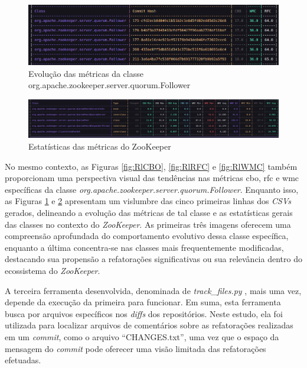 \begin{figure}[h]
    \centering
    \includegraphics[width=0.8\linewidth]{figuras/Output/Metrics_Evolution/Metrics_Evolution.png}
    \caption{Evolução das métricas da classe org.apache.zookeeper.server.quorum.Follower}
    \label{fig:EvolutionFollowerClass}
\end{figure}

\begin{figure}[h]
    \centering
    \includegraphics[width=0.8\linewidth]{figuras/Output/Metrics_Statistics/Metrics_Statistics.png}
    \caption{Estatísticas das métricas do ZooKeeper}
    \label{fig:StatisticsFollowerClass}
\end{figure}

No mesmo contexto, as Figuras \ref{fig:RlCBO}, \ref{fig:RlRFC} e \ref{fig:RlWMC} também proporcionam uma perspectiva visual das tendências nas métricas \gls{cbo}, \gls{rfc} e \gls{wmc} específicas da classe \textit{org.apache.zookeeper.server.quorum.Follower}. Enquanto isso, as Figuras \ref{fig:EvolutionFollowerClass} e \ref{fig:StatisticsFollowerClass} apresentam um vislumbre das cinco primeiras linhas dos \textit{CSVs} gerados, delineando a evolução das métricas de tal classe e as estatísticas gerais das classes no contexto do \textit{ZooKeeper}. As primeiras três imagens oferecem uma compreensão aprofundada do comportamento evolutivo dessa classe específica, enquanto a última concentra-se nas classes mais frequentemente modificadas, destacando sua propensão a refatorações significativas ou sua relevância dentro do ecossistema do \textit{ZooKeeper}.

A terceira ferramenta desenvolvida, denominada de \textit{track\_files.py} \cite{PyDriller:TrackFiles:2023}, mais uma vez, depende da execução da primeira para funcionar. Em suma, esta ferramenta busca por arquivos específicos nos \textit{diffs} dos repositórios. Neste estudo, ela foi utilizada para localizar arquivos de comentários sobre as refatorações realizadas em um \textit{commit}, como o arquivo ``CHANGES.txt'', uma vez que o espaço da mensagem do \textit{commit} pode oferecer uma visão limitada das refatorações efetuadas.

